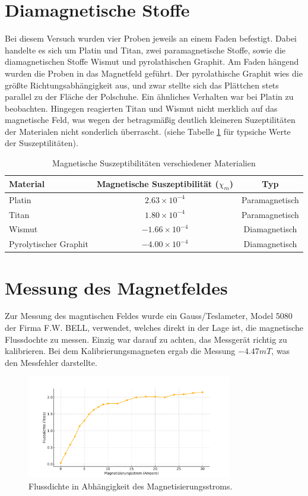 \documentclass[a4paper,twoside,12pt,DIV=13,BCOR=5mm,numbers=noenddot,cleardoublepage=empty]{scrbook}
\begin{document}
\section{Diamagnetische Stoffe}
Bei diesem Versuch wurden vier Proben jeweils an einem Faden befestigt. Dabei handelte es sich um Platin und Titan, zwei paramagnetische Stoffe, sowie die diamagnetischen Stoffe Wismut und pyrolathischen Graphit. Am Faden hängend wurden die Proben in das Magnetfeld geführt. Der pyrolathische Graphit wies die größte Richtungsabhängigkeit aus, und zwar stellte sich das Plättchen stets parallel zu der Fläche der Polschuhe. Ein ähnliches Verhalten war bei Platin zu beobachten. Hingegen reagierten Titan und Wismut nicht merklich auf das magnetische Feld, was wegen der betragsmäßig deutlich kleineren Suzeptilitäten der Materialen nicht sonderlich überrascht. (siehe Tabelle \ref{tab: sus} für typsiche Werte der Suszeptilitäten).

\begin{table}[h]
    \centering
    \begin{tabular}{@{}lcc@{}}
    \toprule
    Material & Magnetische Suszeptibilität (\(\chi_m\)) & Typ \\
    \midrule
    Platin & \(2.63 \times 10^{-4}\) & Paramagnetisch \\
    Titan  & \(1.80 \times 10^{-4}\) & Paramagnetisch \\
    Wismut & \(-1.66 \times 10^{-4}\) & Diamagnetisch \\
    Pyrolytischer Graphit & \(-4.00 \times 10^{-4}\) & Diamagnetisch \\
    \bottomrule
    \end{tabular}
    \caption{Magnetische Suszeptibilitäten verschiedener Materialien}
    \label{tab: sus}
\end{table}

\section{Messung des Magnetfeldes}
Zur Messung des magntischen Feldes wurde ein Gauss/Teslameter, Model 5080 der Firma F.W. BELL, verwendet, welches direkt in der Lage ist, die magnetische Flussdochte zu messen. Einzig war darauf zu achten, das Messgerät richtig zu kalibrieren. Bei dem Kalibrierungsmagneten ergab die Messung $-4.47 mT$, was den Messfehler darstellte.

\begin{figure}[H]
    \centering
    \includegraphics[width=0.8\textwidth]{pictures/Flussdichte_Strom_Plot_Updated.pdf}
    \caption{Flussdichte in Abhängigkeit des Magnetisierungsstroms.}
    \label{fig:flussdichtestrom}
\end{figure}
\end{document}
